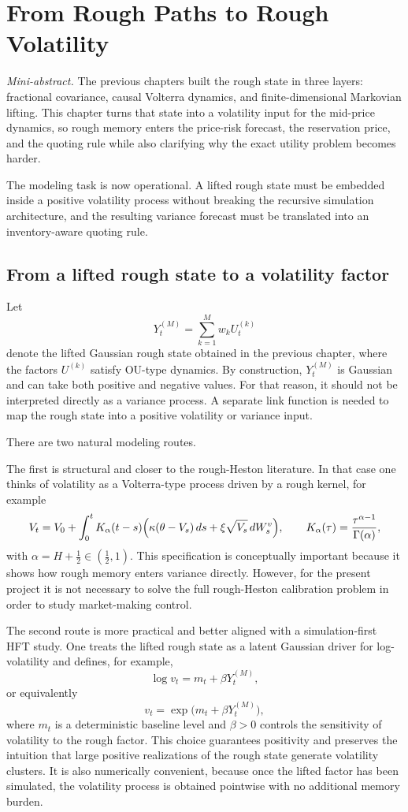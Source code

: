 \documentclass[a4paper,10pt,titlepage,oneside,openany]{book}
\theoremstyle{plain}
\theoremstyle{definition}
\theoremstyle{remark}
\newcommand{\miniabstract}[1]{%
\vspace{-2pt}
\begin{tcolorbox}[colback=gray!6,colframe=black!15,boxrule=0.3pt,arc=3pt,left=6pt,right=6pt,top=4pt,bottom=4pt]
\textit{Mini-abstract.} #1
\end{tcolorbox}
\vspace{-4pt}
}
\newcommand{\1}{\mathbf{1}}
\begin{document}
\chapter{From Rough Paths to Rough Volatility}
\miniabstract{The previous chapters built the rough state in three layers: fractional covariance, causal Volterra dynamics, and finite-dimensional Markovian lifting. This chapter turns that state into a volatility input for the mid-price dynamics, so rough memory enters the price-risk forecast, the reservation price, and the quoting rule while also clarifying why the exact utility problem becomes harder.}

The modeling task is now operational. A lifted rough state must be embedded inside a positive volatility process without breaking the recursive simulation architecture, and the resulting variance forecast must be translated into an inventory-aware quoting rule.

\section{From a lifted rough state to a volatility factor}

Let
\[
Y_t^{(M)}=\sum_{k=1}^M w_k U_t^{(k)}
\]
denote the lifted Gaussian rough state obtained in the previous chapter, where the factors \(U^{(k)}\) satisfy OU-type dynamics. By construction, \(Y_t^{(M)}\) is Gaussian and can take both positive and negative values. For that reason, it should not be interpreted directly as a variance process. A separate link function is needed to map the rough state into a positive volatility or variance input.

There are two natural modeling routes.

The first is structural and closer to the rough-Heston literature. In that case one thinks of volatility as a Volterra-type process driven by a rough kernel, for example
\[
V_t
=
V_0
+
\int_0^t
K_\alpha(t-s)
\Bigl(
\kappa(\theta-V_s)\,ds
+
\xi\sqrt{V_s}\,dW_s^v
\Bigr),
\qquad
K_\alpha(\tau)=\frac{\tau^{\alpha-1}}{\Gamma(\alpha)},
\]
with \(\alpha=H+\tfrac12\in(\tfrac12,1)\). This specification is conceptually important because it shows how rough memory enters variance directly. However, for the present project it is not necessary to solve the full rough-Heston calibration problem in order to study market-making control.

The second route is more practical and better aligned with a simulation-first HFT study. One treats the lifted rough state as a latent Gaussian driver for log-volatility and defines, for example,
\[
\log v_t = m_t + \beta Y_t^{(M)},
\]
or equivalently
\[
v_t = \exp\!\bigl(m_t+\beta Y_t^{(M)}\bigr),
\]
where \(m_t\) is a deterministic baseline level and \(\beta>0\) controls the sensitivity of volatility to the rough factor. This choice guarantees positivity and preserves the intuition that large positive realizations of the rough state generate volatility clusters. It is also numerically convenient, because once the lifted factor has been simulated, the volatility process is obtained pointwise with no additional memory burden.
\end{document}
